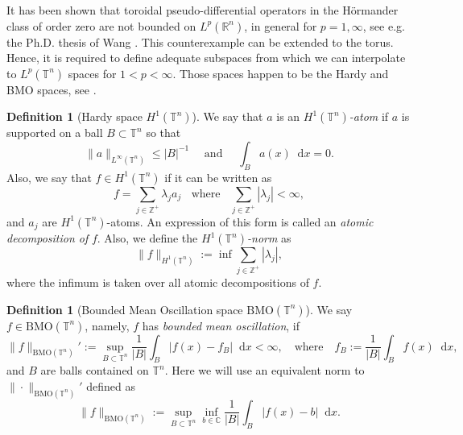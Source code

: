 \documentclass[12pt, reqno]{amsart}
\theoremstyle{definition}
\newtheorem{definition}[theorem]{Definition}
\theoremstyle{remark}
\numberwithin{equation}{section}
\newcommand*\diff{\mathop{}\!\mathrm{d}}
\begin{document}
It has been shown that toroidal pseudo-differential operators in the Hörmander class of order zero are not bounded on $L^p(\mathbb{R}^n)$, in general for $p=1,\infty$, see e.g. the Ph.D. thesis of Wang \cite{wang}. This counterexample can be extended to the torus. Hence, it is required to define adequate subspaces from which we can interpolate to $L^p(\mathbb{T}^n)$ spaces for $1<p<\infty$. Those spaces happen to be the Hardy and BMO spaces, see \cite[pp.~159]{fefferman-stein}.
\begin{definition}[Hardy space $H^1(\mathbb{T}^n)$]
    We say that $a$ is an $H^1(\mathbb{T}^n)$\textit{-atom} if $a$ is supported on a ball $B \subset \mathbb{T}^n$ so that 
    \begin{equation*}
        \|a\|_{L^\infty(\mathbb{T}^n)} \leq |B|^{-1} \quad \text{ and } \quad \int_Ba(x)\diff x = 0.
    \end{equation*}
    Also, we say that $f \in H^1(\mathbb{T}^n)$ if it can be written as  
    \begin{equation*}
        f = \sum_{j \in \mathbb{Z}^+}\lambda_ja_j \;\; \text{ where } \;\; \sum_{j \in \mathbb{Z}^+}|\lambda_j| < \infty,
    \end{equation*}
    and $a_j$ are $H^1(\mathbb{T}^n)$-atoms. An expression of this form is called an \textit{atomic decomposition of }$f$. Also, we define the $H^1(\mathbb{T}^n)$\textit{-norm} as 
    \begin{equation*}
        \|f\|_{H^1(\mathbb{T}^n)} := \inf \sum_{j \in \mathbb{Z}^+}|\lambda_j|,
    \end{equation*}
    where the infimum is taken over all atomic decompositions of $f$. 
\end{definition}

\begin{definition}[Bounded Mean Oscillation space $\mathrm{BMO}(\mathbb{T}^n)$]
    We say $f \in \mathrm{BMO}(\mathbb{T}^n)$, namely, $f$ has \textit{bounded mean oscillation}, if 
    \begin{equation*}
        \|f\|_{\mathrm{BMO}(\mathbb{T}^n)}' := \sup_{B\subset\mathbb{T}^n} \frac{1}{|B|} \int_B \left| f(x) - f_B \right| \diff x < \infty, \quad \mathrm{ where } \quad f_B 
        := \frac{1}{|B|}\int_B f(x)\diff x,
    \end{equation*}
    and $B$ are balls contained on $\mathbb{T}^n$. Here we will use an equivalent norm to $\|\cdot\|_{\mathrm{BMO}(\mathbb{T}^n)}'$ defined as 
    \begin{equation*}
        \|f\|_{\mathrm{BMO}(\mathbb{T}^n)} := \sup_{B\subset\mathbb{T}^n} \inf_{b\in \mathbb{C}} \frac{1}{|B|} \int_B \left| f(x) - b \right| \diff x.
    \end{equation*}
\end{definition}
\end{document}
